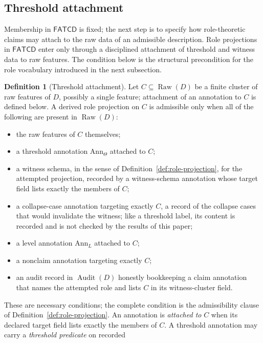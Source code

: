 \documentclass[11pt]{article}
\theoremstyle{definition}
\newtheorem{definition}[theorem]{Definition}
\newcommand{\FATCD}{\ensuremath{\mathsf{FATCD}}}
\newcommand{\Raw}[1]{\ensuremath{\operatorname{Raw}\!\left(#1\right)}}
\newcommand{\Audit}[1]{\ensuremath{\operatorname{Audit}\!\left(#1\right)}}
\begin{document}
\subsection{Threshold attachment}\label{subsec:threshold-attachment}

Membership in \FATCD{} is fixed; the next step is to specify how
role-theoretic claims may attach to the raw data of an admissible
description. Role projections in \FATCD{} enter only through a
disciplined attachment of threshold and witness data to raw features.
The condition below is the structural precondition for the role
vocabulary introduced in the next subsection.

\begin{definition}[Threshold attachment]\label{def:threshold-attachment}
Let \(C\subseteq\Raw{D}\) be a finite cluster of raw features of \(D\), possibly
a single feature; attachment of an annotation to \(C\) is defined below. A derived role projection on \(C\) is
admissible only when all of the following are present in \(\Raw{D}\):
\begin{itemize}[topsep=2pt,itemsep=1pt]
  \item the raw features of \(C\) themselves;
  \item a threshold annotation \(\mathrm{Ann}_\Theta\) attached to \(C\);
  \item a witness schema, in the sense of
    Definition~\ref{def:role-projection}, for the attempted projection, recorded by a witness-schema annotation whose target field lists exactly the members of \(C\);
  \item a collapse-case annotation targeting exactly \(C\), a record of the collapse
    cases that would invalidate the witness; like a threshold label, its
    content is recorded and is not checked by the results of this paper;
  \item a level annotation \(\mathrm{Ann}_L\) attached to \(C\);
  \item a nonclaim annotation targeting exactly \(C\);
  \item an audit record in \(\Audit{D}\) honestly bookkeeping a claim annotation
    that names the attempted role and lists \(C\) in its witness-cluster field.
\end{itemize}
These are necessary conditions; the complete condition is the admissibility
clause of Definition~\ref{def:role-projection}.
An annotation is \emph{attached to} \(C\) when its declared target field
lists exactly the members of \(C\). A threshold annotation may carry a \emph{threshold predicate} on recorded

\end{definition}
\end{document}

